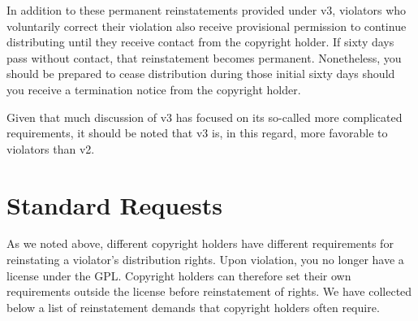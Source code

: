 In addition to these permanent reinstatements provided under v3, violators
who voluntarily correct their violation also receive provisional
permission to continue distributing until they receive contact from the
copyright holder.  If sixty days pass without contact, that reinstatement
becomes permanent.  Nonetheless, you should be prepared to cease
distribution during those initial sixty days should you receive a
termination notice from the copyright holder.

Given that much discussion of v3 has focused on its so-called more
complicated requirements, it should be noted that v3 is, in this regard,
more favorable to violators than v2.

\chapter{Standard Requests}

As we noted above, different copyright holders have different requirements
for reinstating a violator's distribution rights.  Upon violation, you no
longer have a license under the GPL\@.  Copyright holders can therefore
set their own requirements outside the license before reinstatement of
rights.  We have collected below a list of reinstatement demands that
copyright holders often require.

